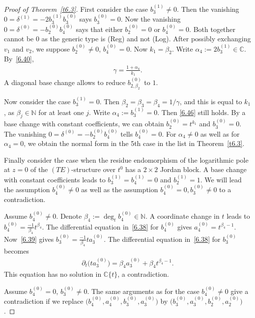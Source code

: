\documentclass[pdftex]{sigma}%
\numberwithin{equation}{section}
\numberwithin{figure}{section}
\newcommand{\N}{{\mathbb N}}
\newcommand{\C}{{\mathbb C}}
\newcommand{\paa}{\partial}
\begin{document}
\begin{proof}[Proof of Theorem~\ref{t6.3}]
First consider the case $b_3^{(1)}\neq 0$. Then
the vanishing $0=\delta^{(1)}=-2b_3^{(1)}b_3^{(0)}$
says $b_3^{(0)}=0$. Now the vanishing
$0=\delta^{(0)}=-b_2^{(0)}b_4^{(0)}$ says that either
$b_2^{(0)}=0$ or $b_4^{(0)}=0$. Both together cannot be
0 as the generic type is (Reg) and not (Log).
After possibly exchanging $v_1$ and $v_2$, we suppose
$b_2^{(0)}\neq 0$, $b_4^{(0)}=0$. Now $k_1=\beta_2$.
Write $\alpha_4:=2b_3^{(1)}\in\C$.
By~\eqref{6.40},
\begin{eqnarray}\label{6.46}
\gamma=\frac{1+\alpha_4}{k_1}.
\end{eqnarray}
A diagonal base change allows to reduce $b_{2,\beta_2}^{(0)}$
to $1$.

Now consider the case $b_3^{(1)}=0$.
Then $\beta_2=\beta_3=\beta_4=1/\gamma$, and this is
equal to $k_1$, as $\beta_j\in\N$ for at least one $j$.
Write $\alpha_4:=b_3^{(1)}=0$. Then
\eqref{6.46} still holds.
By a base change with constant coefficients, we can obtain
$b_2^{(0)}=t^{k_1}$ and $b_3^{(0)}=0$.
The vanishing $0=\delta^{(0)}=-b_2^{(0)}b_4^{(0)}$
tells $b_4^{(0)}=0$.
For $\alpha_4\neq 0$ as well as for $\alpha_4=0$,
we obtain the normal form in the 5th case in the list
in Theorem~\ref{t6.3}.

Finally consider the case when the residue endomorphism
of the logarithmic pole at $z=0$ of the $(TE)$-structure
over $t^0$ has a $2\times 2$ Jordan block.
A base change with constant coefficients leads to
$b_3^{(1)}=b_4^{(1)}=0$ and $b_2^{(1)}=1$.
We will lead the assumption $b_4^{(0)}\neq 0$ as well as the
assumption $b_4^{(0)}=0,b_3^{(0)}\neq 0$ to a contradiction.

{\samepage
Assume $b_4^{(0)}\neq 0$.
Denote $\beta_4:=\deg_t b_4^{(0)}\in\N$.
A coordinate change in $t$ leads to
$b_4^{(0)}=\frac{-1}{\beta_4}t^{\beta_4}$.
The differential equation in~\eqref{6.38} for $b_4^{(0)}$
gives $a_4^{(0)}=t^{\beta_4-1}$.
Now~\eqref{6.39} gives $b_3^{(0)}=\frac{-1}{\beta_4}ta_3^{(0)}$.
The differential equation
in~\eqref{6.38} for $b_3^{(0)}$ becomes
\begin{gather*}
\paa_t \big(ta_3^{(0)}\big)= \beta_4 a_3^{(0)}+\beta_4 t^{\beta_4-1}.
\end{gather*}
This equation has no solution in $\C\{t\}$, a contradiction.

}

Assume $b_4^{(0)}=0$, $b_3^{(0)}\neq 0$.
The same arguments as for the case $b_4^{(0)}\neq 0$
give a contradiction if we replace
$\big(b_4^{(0)},a_4^{(0)},b_3^{(0)},a_3^{(0)}\big)$ by
$\big(b_3^{(0)},a_3^{(0)},b_2^{(0)},a_2^{(0)}\big)$.


\end{proof}
\end{document}
